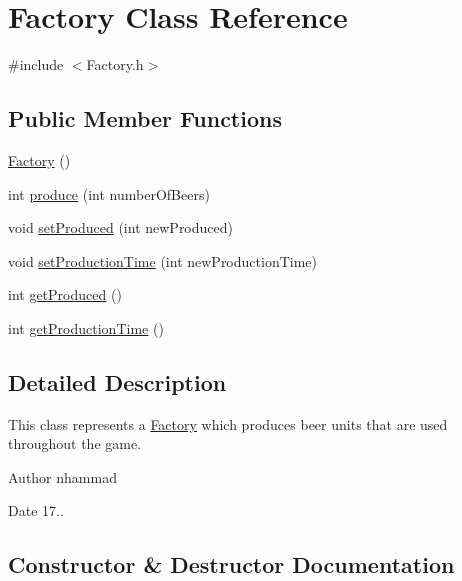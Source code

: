 \hypertarget{classFactory}{}\section{Factory Class Reference}
\label{classFactory}


{\ttfamily \#include $<$Factory.\+h$>$}

\subsection*{Public Member Functions}
\begin{DoxyCompactItemize}
\item 
\hyperlink{classFactory_ac792bf88cfb7b6804b479529da5308cc}{Factory} ()
\item 
int \hyperlink{classFactory_aa882efb228174be27a9f277678b22861}{produce} (int number\+Of\+Beers)
\item 
void \hyperlink{classFactory_a26b79db3c39fb85c25c939ad8e5cc074}{set\+Produced} (int new\+Produced)
\item 
void \hyperlink{classFactory_ac8a766aa4abfeadf7bffb2a4d4baacd2}{set\+Production\+Time} (int new\+Production\+Time)
\item 
int \hyperlink{classFactory_a6d260a0d77406fda5706fe3326d4d757}{get\+Produced} ()
\item 
int \hyperlink{classFactory_a45d76a893eed078b36d8d1c964142b5d}{get\+Production\+Time} ()
\end{DoxyCompactItemize}


\subsection{Detailed Description}
This class represents a \hyperlink{classFactory}{Factory} which produces beer units that are used throughout the game.

\begin{DoxyAuthor}{Author}
nhammad 
\end{DoxyAuthor}
\begin{DoxyDate}{Date}
17.. 
\end{DoxyDate}


\subsection{Constructor \& Destructor Documentation}
\mbox{\label{classFactory_ac792bf88cfb7b6804b479529da5308cc}} 
